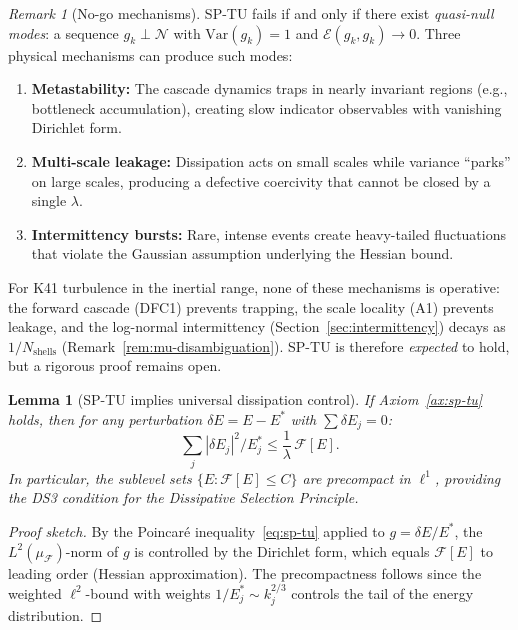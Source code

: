 \documentclass[12pt,a4paper]{article}
\theoremstyle{definition}
\theoremstyle{plain}
\newtheorem{lemma}[definition]{Lemma}
\theoremstyle{remark}
\newtheorem{remark}[definition]{Remark}
\begin{document}
\begin{remark}[No-go mechanisms]\label{rem:sp-nogo}
SP-TU fails if and only if there exist \emph{quasi-null modes}: a sequence $g_k \perp \mathcal{N}$ with $\mathrm{Var}(g_k) = 1$ and $\mathcal{E}(g_k, g_k) \to 0$. Three physical mechanisms can produce such modes:
\begin{enumerate}
\item \textbf{Metastability:} The cascade dynamics traps in nearly invariant regions (e.g., bottleneck accumulation), creating slow indicator observables with vanishing Dirichlet form.
\item \textbf{Multi-scale leakage:} Dissipation acts on small scales while variance ``parks'' on large scales, producing a defective coercivity that cannot be closed by a single $\lambda$.
\item \textbf{Intermittency bursts:} Rare, intense events create heavy-tailed fluctuations that violate the Gaussian assumption underlying the Hessian bound.
\end{enumerate}
For K41 turbulence in the inertial range, none of these mechanisms is operative: the forward cascade (DFC1) prevents trapping, the scale locality (A1) prevents leakage, and the log-normal intermittency (Section~\ref{sec:intermittency}) decays as $1/N_{\mathrm{shells}}$ (Remark~\ref{rem:mu-disambiguation}). SP-TU is therefore \emph{expected} to hold, but a rigorous proof remains open.
\end{remark}

\begin{lemma}[SP-TU implies universal dissipation control]\label{lem:sp-dissipation}
If Axiom~\ref{ax:sp-tu} holds, then for any perturbation $\delta E = E - E^*$ with $\sum \delta E_j = 0$:
\begin{equation}
  \sum_j |\delta E_j|^2 / E_j^* \leq \frac{1}{\lambda}\, \mathcal{F}[E].
\end{equation}
In particular, the sublevel sets $\{E : \mathcal{F}[E] \leq C\}$ are precompact in $\ell^1$, providing the DS3 condition for the Dissipative Selection Principle.
\end{lemma}

\begin{proof}[Proof sketch]
By the Poincar\'e inequality~\eqref{eq:sp-tu} applied to $g = \delta E / E^*$, the $L^2(\mu_{\mathcal{F}})$-norm of $g$ is controlled by the Dirichlet form, which equals $\mathcal{F}[E]$ to leading order (Hessian approximation). The precompactness follows since the weighted $\ell^2$-bound with weights $1/E_j^* \sim k_j^{2/3}$ controls the tail of the energy distribution.
\end{proof}
\end{document}
